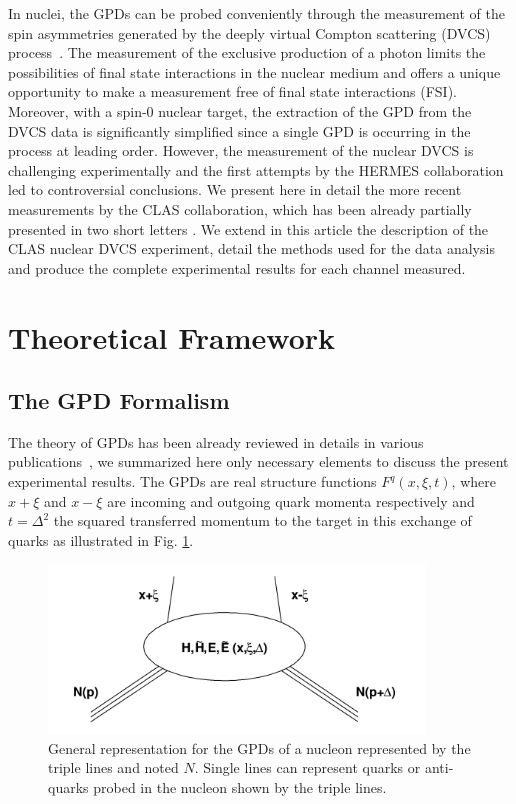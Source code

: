\documentclass{article}
\begin{document}
In nuclei, the GPDs can be probed conveniently through the measurement of the
spin asymmetries generated by the deeply virtual Compton scattering (DVCS) 
process~\cite{Diehl:2003ny,Belitsky:2005qn,Boffi:2007yc,Guidal:2013rya}. The measurement of the exclusive
production of a photon limits the possibilities of final state interactions in the nuclear 
medium and offers a unique opportunity to make a measurement free of final state interactions 
(FSI). Moreover, with a spin-0 nuclear target, the extraction of the GPD from the DVCS data 
is significantly simplified since a single GPD is occurring in the process at leading order. However, the 
measurement of the nuclear DVCS is challenging experimentally and the first attempts by 
the HERMES collaboration \cite{Airapetian:2009cga} led to controversial conclusions. We present here
in detail the more recent measurements by the CLAS collaboration, which has been already partially presented
in two short letters \cite{Hattawy:2017woc,Hattawy:2018liu}. We extend in this article 
the description of the CLAS nuclear DVCS experiment, detail the methods used for the
data analysis and produce the complete experimental results for each channel measured.


\section{Theoretical Framework}

\subsection{The GPD Formalism}

The theory of GPDs has been already reviewed in details in various 
publications~\cite{Diehl:2003ny,Belitsky:2005qn,Boffi:2007yc,Guidal:2013rya},
we summarized here only necessary elements to discuss the present experimental results.
The GPDs are real structure functions $F^{q}(x,\xi,t)$, where $x+\xi$ and $x-\xi$ are incoming and outgoing quark momenta 
respectively and $t=\Delta^2$ the squared transferred momentum to the target in this exchange of quarks as illustrated in 
Fig. \ref{fig:GPD}. 

\begin{figure}[tbp!]
\center
\includegraphics[width=10.0cm]{fig1/GPD.png}
\caption{General representation for the GPDs of a nucleon represented by the triple lines and noted $N$.
	Single lines can represent quarks or anti-quarks probed in the nucleon shown by the triple lines.}
\label{fig:GPD}
\end{figure}
\end{document}
